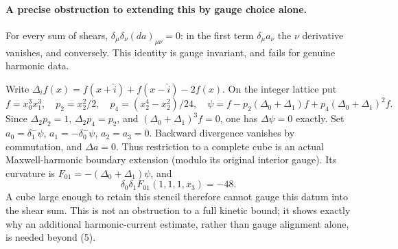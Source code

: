 \documentclass[11pt]{article}
\begin{document}
\paragraph{A precise obstruction to extending this by gauge choice alone.}
For every sum of shears,
$\delta_\mu\delta_\nu(da)_{\mu\nu}=0$: in the first term
$\delta_\mu a_\nu$ the $\nu$ derivative vanishes, and conversely.
This identity is gauge invariant, and fails for genuine harmonic data.

Write $\Delta_i f(x)=f(x+\hat i)+f(x-\hat i)-2f(x)$.
On the integer lattice put
\[
 f=x_0^3x_1^3,\quad
 p_2=x_2^2/2,\quad p_4=(x_2^4-x_2^2)/24,\quad
 \psi=f-p_2(\Delta_0+\Delta_1)f
                  +p_4(\Delta_0+\Delta_1)^2f.
\]
Since $\Delta_2p_2=1$, $\Delta_2p_4=p_2$, and
$(\Delta_0+\Delta_1)^3f=0$, one has $\Delta\psi=0$ exactly.
Set $a_0=\delta_1^-\psi$, $a_1=-\delta_0^-\psi$, $a_2=a_3=0$.
Backward divergence vanishes by commutation, and $\Delta a=0$.
Thus restriction to a complete cube is an actual Maxwell-harmonic
boundary extension (modulo its original interior gauge).
Its curvature is $F_{01}=-(\Delta_0+\Delta_1)\psi$, and
\[
 \delta_0\delta_1F_{01}(1,1,1,x_3)=-48.
\]
A cube large enough to retain this stencil therefore cannot gauge this
datum into the shear sum. This is not an obstruction to a full kinetic
bound; it shows exactly why an additional harmonic-current estimate,
rather than gauge alignment alone, is needed beyond (5).
\end{document}
